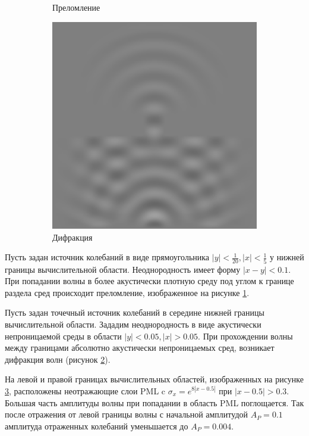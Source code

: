 \documentclass[a4paper, fontsize=14pt]{article}
\begin{document}
\begin{figure}[h]
\begin{subfigure}{0.3\textwidth}
		\caption{Преломление}
		\label{wrefr}
	\end{subfigure}
	\begin{subfigure}{0.3\textwidth}
		\centering
		\includegraphics[width=\textwidth]{difr.eps}
		\caption{Дифракция}
		\label{wdifr}
	\end{subfigure}
    \caption{}
    \label{wphenomena}
\end{figure}

Пусть задан источник колебаний в виде прямоугольника $|y|<\frac{1}{20}, |x| < \frac{1}{5}$ у нижней
границы вычислительной области. Неоднородность имеет форму $|x-y| <0.1$.
При попадании волны в более акустически плотную среду под углом к границе раздела сред происходит
преломление, изображенное на рисунке \ref{wrefr}. 

Пусть задан точечный источник колебаний в середине нижней границы вычислительной области.
Зададим неоднородность в виде акустически непроницаемой среды в области $|y|<0.05, |x| >0.05$.
При прохождении волны между границами абсолютно
акустически непроницаемых сред, возникает дифракция волн (рисунок \ref{wdifr}). 

На левой и правой границах вычислительных областей, изображенных на рисунке \ref{wphenomena}, 
расположены неотражающие слои PML c $\sigma_x = e^{8 |x-0.5|}$ при $|x-0.5|>0.3$.
Большая часть амплитуды волны при попадании в область PML поглощается.
Так после отражения от левой границы волны с начальной амплитудой $A_P = 0.1$ амплитуда отраженных
колебаний уменьшается до  $A_P = 0.004$.
\end{document}
